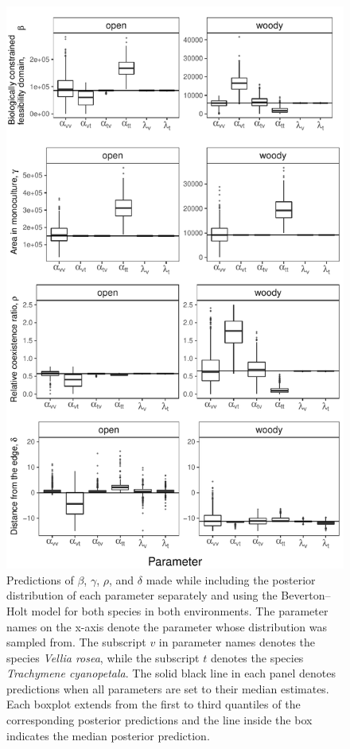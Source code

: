 \begin{refsection}
\begin{figure}[H]
  \centerline{\includegraphics[width=.95\textwidth]{figures/chapter3_fig5.pdf}}
  \caption[Predictions of $\beta$, $\gamma$, $\rho$, and $\delta$  made while including the posterior distribution of each parameter separately and using the Beverton--Holt model for both species in both environments]{Predictions of $\beta$, $\gamma$, $\rho$, and $\delta$  made while including the posterior distribution of each parameter separately and using the Beverton--Holt model for both species in both environments. The parameter names on the x-axis denote the parameter whose distribution was sampled from. The subscript $v$ in parameter names denotes the species \textit{Vellia rosea}, while the subscript $t$ denotes the species \textit{Trachymene cyanopetala}. The solid black line in each panel denotes predictions when all parameters are set to their median estimates. Each boxplot extends from the first to third quantiles of the corresponding posterior predictions and the line inside the box indicates the median posterior prediction.   }
    \label{fig:params}
\end{figure}


\end{refsection}
